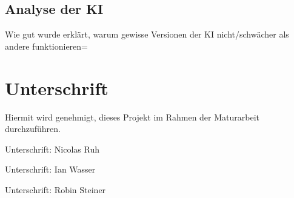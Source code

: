 \documentclass{article}
\begin{document}
\subsection{Analyse der KI}
\label{chap:erklaerung}
Wie gut wurde erklärt, warum gewisse Versionen der KI nicht/schwächer als andere funktionieren=




\section{Unterschrift}
\label{chap:unterschrift}

Hiermit wird genehmigt, dieses Projekt im Rahmen der Maturarbeit
durchzuführen.

\vspace*{1cm}

Unterschrift: \hrulefill Nicolas Ruh \vspace*{2cm}

Unterschrift: \hrulefill Ian Wasser \vspace*{2cm}

Unterschrift: \hrulefill Robin Steiner \vspace*{2cm}

\printbibliography[heading=bibintoc]
\end{document}
